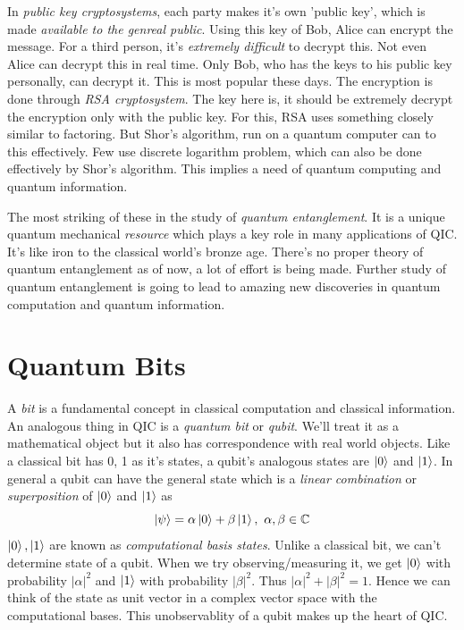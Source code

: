 In \textit{public key cryptosystems}, each party makes it's own 'public key', which is made \textit{available to the genreal public}. Using this key of Bob, Alice can encrypt the message. For a third person, it's \textit{extremely difficult} to decrypt this. Not even Alice can decrypt this in real time. Only Bob, who has the keys to his public key personally, can decrypt it. This is most popular these days. The encryption is done through \textit{RSA cryptosystem}. The key here is, it should be extremely decrypt the encryption only with the public key. For this, RSA uses something closely similar to factoring. But Shor's algorithm, run on a quantum computer can to this effectively. Few use discrete logarithm problem, which can also be done effectively by Shor's algorithm. This implies a need of quantum computing and quantum information.

The most striking of these in the study of \textit{quantum entanglement}. It is a unique quantum mechanical \textit{resource} which plays a key role in many applications of QIC. It's like iron to the classical world's bronze age. There's no proper theory of quantum entanglement as of now, a lot of effort is being made. Further study of quantum entanglement is going to lead to amazing new discoveries in quantum computation and quantum information.

\section{Quantum Bits}

A \textit{bit} is a fundamental concept in classical computation and classical information. An analogous thing in QIC is a \textit{quantum bit} or \textit{qubit}. We'll treat it as a mathematical object but it also has correspondence with real world objects. Like a classical bit has 0, 1 as it's states, a qubit's analogous states are $\ket{0}$ and $\ket{1}$. In general a qubit can have the general state which is a \textit{linear combination} or \textit{superposition} of $\ket{0}$ and $\ket{1}$ as \begin{equation}
    \ket{\psi} = \alpha \ket{0} + \beta \ket{1},\ \alpha,\beta \in \mathbb{C}
\end{equation}
$\ket{0}, \ket{1}$ are known as \textit{computational basis states}. Unlike a classical bit, we can't determine state of a qubit. When we try observing/measuring it, we get $\ket{0}$ with probability $|\alpha|^2$ and $\ket{1}$ with probability $|\beta|^2$. Thus $|\alpha|^2 + |\beta|^2 = 1$. Hence we can think of the state as unit vector in a complex vector space with the computational bases. This unobservablity of a qubit makes up the heart of QIC. 

